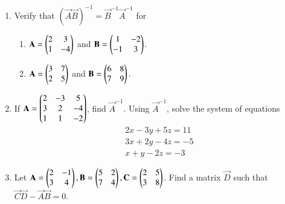 \begin{enumerate}[label=\thesubsection.\arabic*,ref=\thesubsection.\theenumi,resume*]
\item Verify that $(\vec{A}\vec{B})^{-1}=\vec{B}^{-1} \vec{A}^{-1}$ for
	\begin{enumerate}
\item $\mathbf{A}=\begin{pmatrix}2&3 \\1&-4\end{pmatrix}$ and $\mathbf{B}=\begin{pmatrix}1&-2 \\-1&3\end{pmatrix}$.
\item $\mathbf{A}=\begin{pmatrix}3 & 7 \\ 2 & 5\end{pmatrix}$ and $\mathbf{B}=\begin{pmatrix}6 & 8 \\ 7 & 9\end{pmatrix}$. 
\end{enumerate}
\item If $\mathbf{A}=\begin{pmatrix}2&-3&5\\ 3&2&-4\\ 1&1&-2\end{pmatrix}$, find $\vec{A}^{-1}$.  Using $\vec{A}^{-1}$, solve the system of equations
\begin{align}
 2x-3y+5z =  11\\
 3x+2y-4z = -5\\
 x+y-2z = -3
\end{align}
\item Let $\mathbf{A}=\begin{pmatrix}2&-1\\3&4\end{pmatrix}, \mathbf{B}=\begin{pmatrix}5&2\\7&4\end{pmatrix}, \mathbf{C}=\begin{pmatrix}2&5\\3&8\end{pmatrix}$.  Find a matrix $\vec{D}$ such that $\vec{C}\vec{D}-\vec{A}\vec{B}=0$. 
\end{enumerate}
